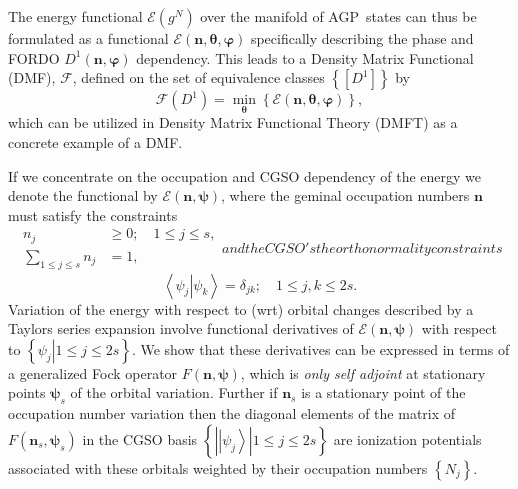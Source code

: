 \documentclass[aps,preprint]{revtex4}%
\begin{document}
The energy functional $\mathcal{E}\left(  g^{N}\right)  $ over the manifold of
AGP\ states can thus be formulated as a functional $\mathcal{E}\left(
\mathbf{n},\mathbf{\theta,\varphi}\right)  $ specifically describing the phase
and FORDO $D^{1}\left(  \mathbf{n},\mathbf{\varphi}\right)  $ dependency. This
leads to a Density Matrix Functional (DMF), $\mathcal{F}$, defined on the set
of equivalence classes $\left\{  \left[  D^{1}\right]  \right\}  $ by\
\begin{equation}
\mathcal{F}\left(  D^{1}\right)  =\min_{\mathbf{\theta}}\left\{
\mathcal{E}\left(  \mathbf{n},\mathbf{\theta,\varphi}\right)  \right\}  ,
\end{equation}
which can be utilized in Density Matrix Functional Theory (DMFT) as a concrete
example of a DMF.

If we concentrate on the occupation and CGSO dependency of the energy we
denote the functional by $\mathcal{E}\left(  \mathbf{n},\mathbf{\psi}\right)
$, where the geminal occupation numbers $\mathbf{n}$ must satisfy the
constraints
\begin{subequations}
\begin{align}
n_{j}  &  \geq0;\quad1\leq j\leq s,\\
\sum_{1\leq j\leq s}n_{j}  &  =1,
\end{align}
and the CGSO's the orthonormality constraints%
\end{subequations}
\begin{equation}
\left\langle \left.  \psi_{j}\right\vert \psi_{k}\right\rangle =\delta
_{jk};\quad1\leq j,k\leq2s.
\end{equation}
Variation of the energy with respect to (wrt) orbital changes described by a
Taylors series expansion involve functional derivatives of $\mathcal{E}\left(
\mathbf{n},\mathbf{\psi}\right)  $ with respect to $\left\{  \left.  \psi
_{j}\right\vert 1\leq j\leq2s\right\}  .$ We show that these derivatives can
be expressed in terms of a generalized Fock operator $F\left(  \mathbf{n}%
,\mathbf{\psi}\right)  $, which is \emph{only self adjoint} at stationary
points $\mathbf{\psi}_{s}$ of the orbital variation. Further if $\mathbf{n}%
_{s}$ is a stationary point of the occupation number variation then the
diagonal elements of the matrix of $F\left(  \mathbf{n}_{s},\mathbf{\psi}%
_{s}\right)  $ in the CGSO basis $\left\{  \left\vert \left\vert \psi
_{j}\right\rangle \right\vert 1\leq j\leq2s\right\}  $ are ionization
potentials associated with these orbitals weighted by their occupation numbers
$\left\{  N_{j}\right\}  $.
\end{document}
